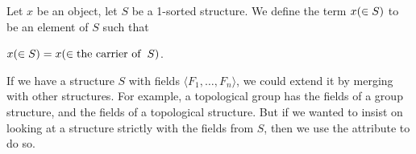\documentclass{article}
\begin{document}
\begin{definition}
Let $x$ be an object, let $S$ be a 1-sorted structure.
We define the term $x(\in S)$ to be an element of $S$ such that
\begin{defn}
\item $x(\in S)=x(\in \operatorname{the\ carrier\ of\ }S)$.
\end{defn}
\end{definition}

\begin{remark}
If we have a structure $S$ with fields $\langle F_{1},\dots,F_{n}\rangle$,
we could extend it by merging with other structures. For example, a
topological group has the fields of a group structure, and the fields of
a topological structure. But if we wanted to insist on looking at a
structure strictly with the fields from $S$, then we use the attribute
 to do so.
\end{remark}
\end{document}
